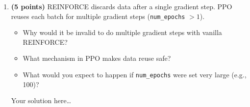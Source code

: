 \documentclass[11pt]{article}
\begin{document}
\begin{enumerate}[label=(\alph*)]
Let $\epsilon = 0.2$.  Work through the following two scenarios:

\medskip
\textbf{Scenario 1:} $\hat{A}_t = +3.0$ and $r_t(\theta)=1.5$
(the new policy is 50\% more likely to take this action).
\begin{itemize}
  \item Compute $\text{surr}_1 = r_t \cdot \hat{A}_t$.
  \item Compute $\text{surr}_2
        = \text{clip}(r_t, 0.8, 1.2) \cdot \hat{A}_t$.
  \item What is $L^{\text{CLIP}}$ for this sample?
        Is the policy encouraged to keep increasing $r_t$ beyond 1.2?
\end{itemize}

\textbf{Scenario 2:} $\hat{A}_t = -2.0$ and $r_t(\theta)=0.6$
(the new policy has reduced the probability of this bad action).
\begin{itemize}
  \item Compute $\text{surr}_1$ and $\text{surr}_2$.
  \item What is $L^{\text{CLIP}}$ for this sample?
        Is the policy encouraged to reduce $r_t$ further below 0.8?
\end{itemize}

Using these examples, explain in 2--3 sentences why the clipping mechanism
acts as a ``trust region'' that prevents destructively large policy updates.

\begin{solution}
Your solution here\ldots
\end{solution}

\item \textbf{(5 points)} REINFORCE discards data after a single gradient
step.  PPO reuses each batch for multiple gradient steps
(\texttt{num\_epochs} $> 1$).
\begin{itemize}
  \item Why would it be invalid to do multiple gradient steps with vanilla
        REINFORCE?
  \item What mechanism in PPO makes data reuse safe?
  \item What would you expect to happen if \texttt{num\_epochs} were set
        very large (e.g., 100)?
\end{itemize}

\begin{solution}
Your solution here\ldots
\end{solution}
\end{enumerate}
\end{document}
